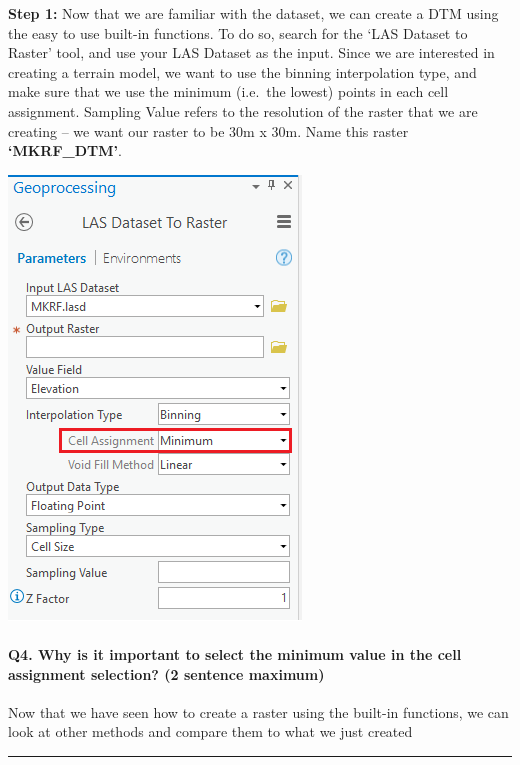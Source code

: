 \documentclass[
]{book}
\begin{document}
\textbf{Step 1:} Now that we are familiar with the dataset, we can create a DTM using the easy to use built-in functions. To do so, search for the `LAS Dataset to Raster' tool, and use your LAS Dataset as the input. Since we are interested in creating a terrain model, we want to use the binning interpolation type, and make sure that we use the minimum (i.e.~the lowest) points in each cell assignment. Sampling Value refers to the resolution of the raster that we are creating -- we want our raster to be 30m x 30m. Name this raster \textbf{`MKRF\_DTM'}.

\begin{center}\includegraphics[width=0.4\linewidth]{images/04-las-dataset-to-raster} \end{center}

\hypertarget{q4.-why-is-it-important-to-select-the-minimum-value-in-the-cell-assignment-selection-2-sentence-maximum}{%
\paragraph*{Q4. Why is it important to select the minimum value in the cell assignment selection? (2 sentence maximum)}\label{q4.-why-is-it-important-to-select-the-minimum-value-in-the-cell-assignment-selection-2-sentence-maximum}}

Now that we have seen how to create a raster using the built-in functions, we can look at other methods and compare them to what we just created

\begin{center}\rule{0.5\linewidth}{0.5pt}\end{center}
\end{document}
